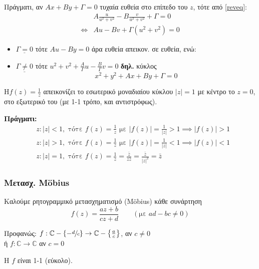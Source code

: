 \documentclass[12pt,a4paper,notitlepage,fleqn]{article}
\begin{document}
     Πράγματι, αν
     \( Ax+By+\Gamma = 0 \) τυχαία ευθεία στο επίπεδο του \( z \), τότε
     από \eqref{reveq}:
     \begin{align*}
     & A\frac{u}{u^2+v^2} - B \frac{v}{u^2+v^2} + \Gamma = 0
     \\ \iff & \boxed{
     	Au-Bv + \Gamma\left( u^2+v^2 \right) = 0
     	}
     \end{align*}

     \begin{itemize}
     	\item \( \underline{\Gamma = 0} \) τότε \( Au-By = 0 \)
     	άρα ευθεία απεικον. σε ευθεία, ενώ:
     	\item \( \underline{\Gamma \neq 0} \) τότε \(
     	u^2+v^2+\frac{A}{\Gamma}u-\frac{B}{\Gamma}v = 0
     	 \) \textbf{δηλ.} κύκλος
     	 \[
     	 x^2+y^2+Ax+By+\Gamma = 0
     	 \]
     \end{itemize}

     Η\( f(z) = \frac{1}{z} \) απεικονίζει το εσωτερικό μοναδιαίου κύκλου
     \( |z| = 1 \) με κέντρο το \( z=0 \), στο εξωτερικό του (με 1-1 τρόπο, και
     αντιστρόφως).

     \textbf{Πράγματι:}
     \begin{align*}
     & z: |z| < 1, \text{ τότε } f(z) = \frac{1}{z} \text{ με } \left|f(z)\right|
     = \frac{1}{|z|}>1 \implies \left|f(z)\right|> 1 \\
     & z: |z| > 1, \text{ τότε } f(z) = \frac{1}{z} \text{ με } \left|f(z)\right|
      = \frac{1}{|z|}<1 \implies \left|f(z)\right|< 1 \\
     & z: |z| = 1, \text{ τότε } f(z) = \frac{1}{z} = \frac{\bar z}{z\bar z}
     = \frac{\bar z}{|z|^2} = \bar z
     \end{align*}

     \subsubsection{Μετασχ. M\"obius}
     Καλούμε ρητογραμμικό μετασχηματισμό (M\"obius) κάθε συνάρτηση
     \[
     f(z) = \frac{az+b}{cz+d}\qquad (\text{με } ad-bc \neq 0)
     \]

     Προφανώς: \( f: \mathbb C - \left\lbrace - \sfrac{d}{c}  \right\rbrace
     \to \mathbb C  - \left\lbrace \frac{a}{c} \right\rbrace
     \), αν \( c \neq 0 \)
     \\ ή \( f: \mathbb C \to \mathbb C \) \quad αν \( c = 0 \)

     H \( f \) είναι 1-1 (εύκολο).
\end{document}
